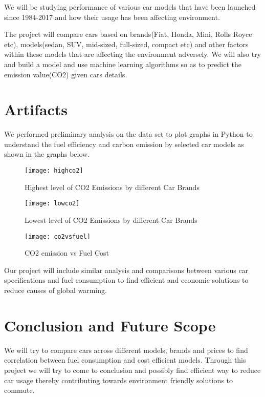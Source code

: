 \documentclass{acm_proc_article-sp}
\begin{document}
We will be studying performance of various car models that have been launched since 1984-2017 and how their usage has been affecting environment.

The project will compare cars based on brands(Fiat, Honda, Mini, Rolls Royce etc), models(sedan, SUV, mid-sized, full-sized, compact etc) and other factors within these models that are affecting the environment adversely. We will also try and build a model and use machine learning algorithms so as to predict the emission value(CO2) given cars details.

\section{Artifacts}

We performed preliminary analysis on the data set to plot graphs in Python to understand the fuel efficiency and carbon emission by selected car models as shown in the graphs below.


\begin{figure}
\centering
\texttt{[image: highco2]}
\caption{Highest level of CO2 Emissions by different Car Brands}
\end{figure}

\begin{figure}
\centering
\texttt{[image: lowco2]}
\caption{Lowest level of CO2 Emissions by different Car Brands}
\end{figure}

\begin{figure}
\centering
\texttt{[image: co2vsfuel]}
\caption{CO2 emission vs Fuel Cost}
\end{figure}

Our project will include similar analysis and comparisons between various car specifications and fuel consumption to find efficient and economic solutions to reduce causes of global warming.

\section{Conclusion and Future Scope}
We will try to compare cars across different models, brands and prices to find correlation between fuel consumption and cost efficient models.
Through this project we will try to come to conclusion and possibly find efficient way to reduce car usage thereby contributing towards environment friendly solutions to commute.



\end{document}
